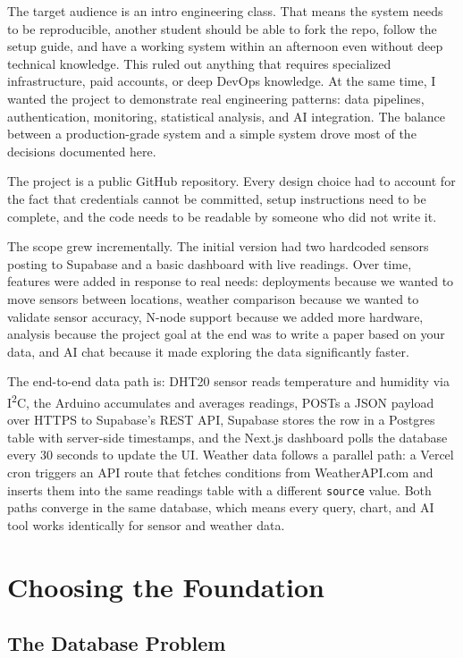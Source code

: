 \documentclass[11pt, letterpaper]{article}
\begin{document}
The target audience is an intro engineering class. That means the system needs to be reproducible, another student should be able to fork the repo, follow the setup guide, and have a working system within an afternoon even without deep technical knowledge. This ruled out anything that requires specialized infrastructure, paid accounts, or deep DevOps knowledge. At the same time, I wanted the project to demonstrate real engineering patterns: data pipelines, authentication, monitoring, statistical analysis, and AI integration. The balance between a production-grade system and a simple system drove most of the decisions documented here.

The project is a public GitHub repository. Every design choice had to account for the fact that credentials cannot be committed, setup instructions need to be complete, and the code needs to be readable by someone who did not write it.

The scope grew incrementally. The initial version had two hardcoded sensors posting to Supabase and a basic dashboard with live readings. Over time, features were added in response to real needs: deployments because we wanted to move sensors between locations, weather comparison because we wanted to validate sensor accuracy, N-node support because we added more hardware, analysis because the project goal at the end was to write a paper based on your data, and AI chat because it made exploring the data significantly faster.

The end-to-end data path is: DHT20 sensor reads temperature and humidity via I\textsuperscript{2}C, the Arduino accumulates and averages readings, POSTs a JSON payload over HTTPS to Supabase's REST API, Supabase stores the row in a Postgres table with server-side timestamps, and the Next.js dashboard polls the database every 30 seconds to update the UI. Weather data follows a parallel path: a Vercel cron triggers an API route that fetches conditions from WeatherAPI.com and inserts them into the same readings table with a different \texttt{source} value. Both paths converge in the same database, which means every query, chart, and AI tool works identically for sensor and weather data.


\newpage
\section{Choosing the Foundation}

\subsection{The Database Problem}
\end{document}
